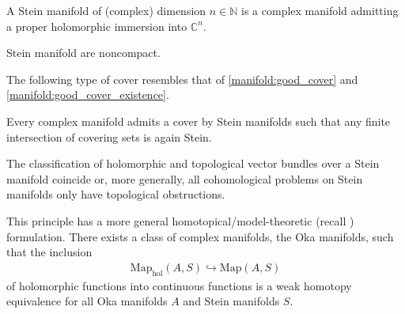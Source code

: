     \begin{adefinition}
        A Stein manifold of (complex) dimension $n\in\mathbb{N}$ is a complex manifold admitting a proper holomorphic immersion into $\mathbb{C}^n$.
    \end{adefinition}

    \begin{property}
        Stein manifold are noncompact.
    \end{property}

    The following type of cover resembles that of \cref{manifold:good_cover} and \cref{manifold:good_cover_existence}.
    \begin{property}
        Every complex manifold admits a cover by Stein manifolds such that any finite intersection of covering sets is again Stein.
    \end{property}

    \begin{property}
        The classification of holomorphic and topological vector bundles over a Stein manifold coincide or, more generally, all cohomological problems on Stein manifolds only have topological obstructions.
    \end{property}
    \begin{remark}
        This principle has a more general homotopical/model-theoretic (recall ) formulation. There exists a class of complex manifolds, the Oka manifolds, such that the inclusion
        \begin{gather}
            \mathrm{Map}_\text{hol}(A,S)\hookrightarrow\mathrm{Map}(A,S)
        \end{gather}
        of holomorphic functions into continuous functions is a weak homotopy equivalence for all Oka manifolds $A$ and Stein manifolds $S$.
    \end{remark}

